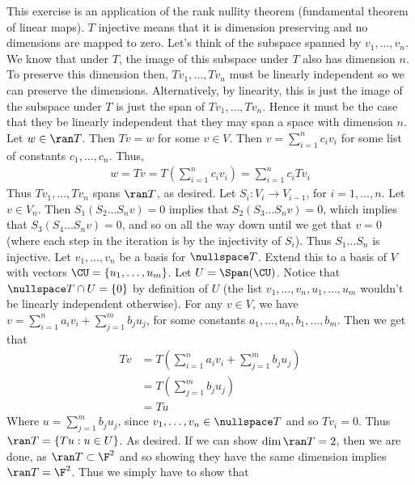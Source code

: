 \documentclass{book}
\begin{document}
\begin{enumerate}[label=\arabic*)]
      This exercise is an application of the rank nullity theorem (fundamental theorem of linear maps). $T$ injective means that it is dimension preserving and no dimensions are mapped to
      zero. Let's think of the subspace spanned by $v_1, \dots, v_n$. We know that under $T$, the image of this subspace under $T$ also has dimension $n$. To preserve this dimension then,
      $Tv_1, \dots, Tv_n$ must be linearly independent so we can preserve the dimensions. Alternatively, by linearity, this is just the image of the subspace under $T$ is just the span of
      $Tv_1, \dots, Tv_n$. Hence it must be the case that they be linearly independent that they may span a space with dimension $n$.
     \ii
       Let $w \in \ran T$. Then $Tv = w$ for some $v \in V$. Then $v = \sum_{i = 1}^{n}c_iv_i$ for some list of constants $c_1, \dots, c_n$. Thus,
       \begin{align*}
         w = Tv = T(\sum_{i = 1}^{n}c_iv_i) = \sum_{i = 1}^{n}c_iTv_i
       \end{align*}
       Thus $Tv_1, \dots, Tv_n$ spans $\ran T$, as desired.
     \ii
       Let $S_i: V_i \to V_{i - 1}$, for $i = 1, \dots, n$. Let $v \in V_n$. Then $S_1(S_2\dots S_nv) = 0$ implies that $S_2(S_3\dots S_nv) = 0$, which implies that $S_3(S_4\dots S_nv) = 0$,
       and so on all the way down until we get that $v = 0$ (where each step in the iteration is by the injectivity of $S_i$). Thus $S_1\dots S_n$ is injective. 
     \ii
       Let $v_1, \dots, v_n$ be a basis for $\nullspace T$. Extend this to a basis of $V$ with vectors $\CU = \{u_1, \dots, u_m\}$. Let $U = \Span(\CU)$. Notice that $\nullspace T \cap U = \{0\}$
       by definition of $U$ (the list $v_1, \dots, v_n, u_1, \dots, u_m$ wouldn't be linearly independent otherwise). For any $v \in V$, we have $v = \sum_{i = 1}^{n}a_iv_i + \sum_{j =
       1}^{m}b_ju_j$, for some constants $a_1, \dots, a_n, b_1, \dots, b_m$. Then we get that 
       \begin{align*}
         Tv & = T(\sum_{i = 1}^{n}a_iv_i + \sum_{j = 1}^{m}b_ju_j) \\
         & = T(\sum_{j = 1}^{m}b_ju_j) \\
         & = Tu
       \end{align*}
       Where $u = \sum_{j = 1}^{m}b_ju_j$, since $v_1, \dots, v_n \in \nullspace T$ and so $Tv_i = 0$. Thus $\ran T = \{Tu: u \in U\}$. As desired.
     \ii
       If we can show $\dim\ran T = 2$, then we are done, as $\ran T \subset \F^2$ and so showing they have the same dimension implies $\ran T = \F^2$. Thus we simply have to show that

\end{enumerate}
\end{document}
